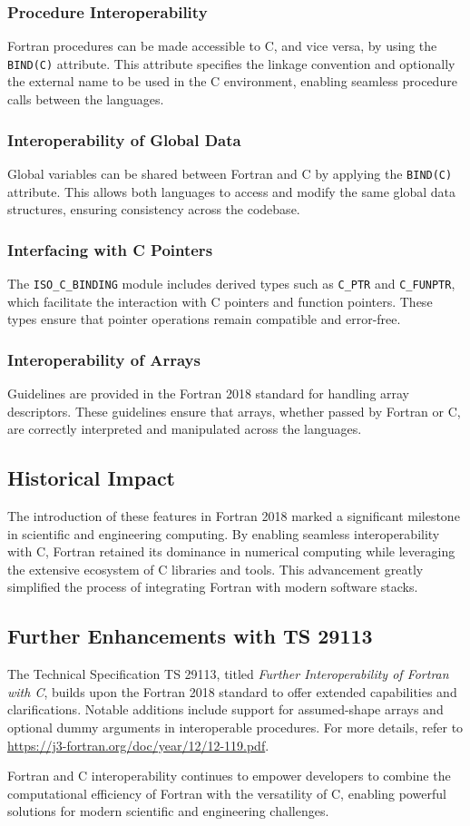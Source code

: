 \subsubsection{Procedure Interoperability}
Fortran procedures can be made accessible to C, and vice versa, by using the \texttt{BIND(C)} attribute. This attribute specifies the linkage convention and optionally the external name to be used in the C environment, enabling seamless procedure calls between the languages.

\subsubsection{Interoperability of Global Data}
Global variables can be shared between Fortran and C by applying the \texttt{BIND(C)} attribute. This allows both languages to access and modify the same global data structures, ensuring consistency across the codebase.

\subsubsection{Interfacing with C Pointers}
The \texttt{ISO\_C\_BINDING} module includes derived types such as \texttt{C\_PTR} and \texttt{C\_FUNPTR}, which facilitate the interaction with C pointers and function pointers. These types ensure that pointer operations remain compatible and error-free.

\subsubsection{Interoperability of Arrays}
Guidelines are provided in the Fortran 2018 standard for handling array descriptors. These guidelines ensure that arrays, whether passed by Fortran or C, are correctly interpreted and manipulated across the languages.

\subsection{Historical Impact}
The introduction of these features in Fortran 2018 marked a significant milestone in scientific and engineering computing. By enabling seamless interoperability with C, Fortran retained its dominance in numerical computing while leveraging the extensive ecosystem of C libraries and tools. This advancement greatly simplified the process of integrating Fortran with modern software stacks.

\subsection{Further Enhancements with TS 29113}
The Technical Specification TS 29113, titled \emph{Further Interoperability of Fortran with C}, builds upon the Fortran 2018 standard to offer extended capabilities and clarifications. Notable additions include support for assumed-shape arrays and optional dummy arguments in interoperable procedures. For more details, refer to \url{https://j3-fortran.org/doc/year/12/12-119.pdf}.

Fortran and C interoperability continues to empower developers to combine the computational efficiency of Fortran with the versatility of C, enabling powerful solutions for modern scientific and engineering challenges.

\endinput  %